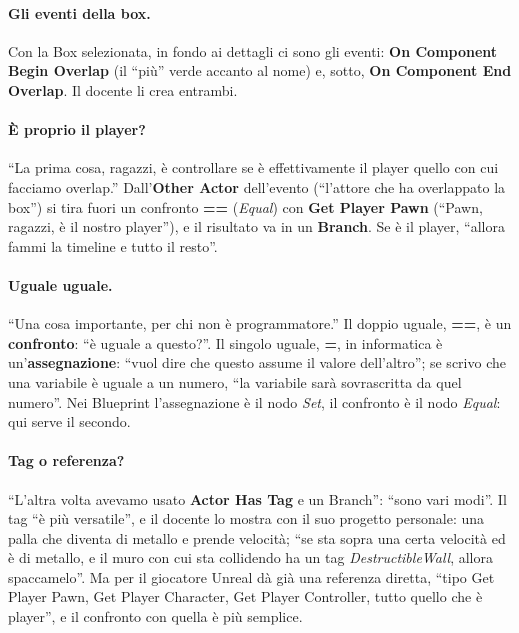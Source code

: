 \paragraph{Gli eventi della box.} Con la Box selezionata, in fondo ai dettagli ci sono
gli eventi: \textbf{On Component Begin Overlap} (il ``più'' verde accanto al nome) e,
sotto, \textbf{On Component End Overlap}. Il docente li crea entrambi.

\paragraph{È proprio il player?} ``La prima cosa, ragazzi, è controllare se è
effettivamente il player quello con cui facciamo overlap.'' Dall'\textbf{Other Actor}
dell'evento (``l'attore che ha overlappato la box'') si tira fuori un confronto
\textbf{==} (\emph{Equal}) con \textbf{Get Player Pawn} (``Pawn, ragazzi, è il nostro
player''), e il risultato va in un \textbf{Branch}. Se è il player, ``allora fammi la
timeline e tutto il resto''.

\paragraph{Uguale uguale.} ``Una cosa importante, per chi non è programmatore.'' Il
doppio uguale, \textbf{==}, è un \textbf{confronto}: ``è uguale a questo?''. Il singolo
uguale, \textbf{=}, in informatica è un'\textbf{assegnazione}: ``vuol dire che questo
assume il valore dell'altro''; se scrivo che una variabile è uguale a un numero, ``la
variabile sarà sovrascritta da quel numero''. Nei Blueprint l'assegnazione è il nodo
\emph{Set}, il confronto è il nodo \emph{Equal}: qui serve il secondo.

\paragraph{Tag o referenza?} ``L'altra volta avevamo usato \textbf{Actor Has Tag} e un
Branch'': ``sono vari modi''. Il tag ``è più versatile'', e il docente lo mostra con il
suo progetto personale: una palla che diventa di metallo e prende velocità; ``se sta
sopra una certa velocità ed è di metallo, e il muro con cui sta collidendo ha un tag
\emph{DestructibleWall}, allora spaccamelo''. Ma per il giocatore Unreal dà già una
referenza diretta, ``tipo Get Player Pawn, Get Player Character, Get Player Controller,
tutto quello che è player'', e il confronto con quella è più semplice.

